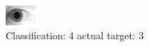 \begin{figure}[h!]
\begin{center}
\includegraphics[width=0.60\columnwidth]{figures/ID1946_class_4_target_3.png}
\end{center}
\caption{ Classification: 4 actual target: 3}
\label{fig:ID1946_class_4_target_3}
\end{figure}
